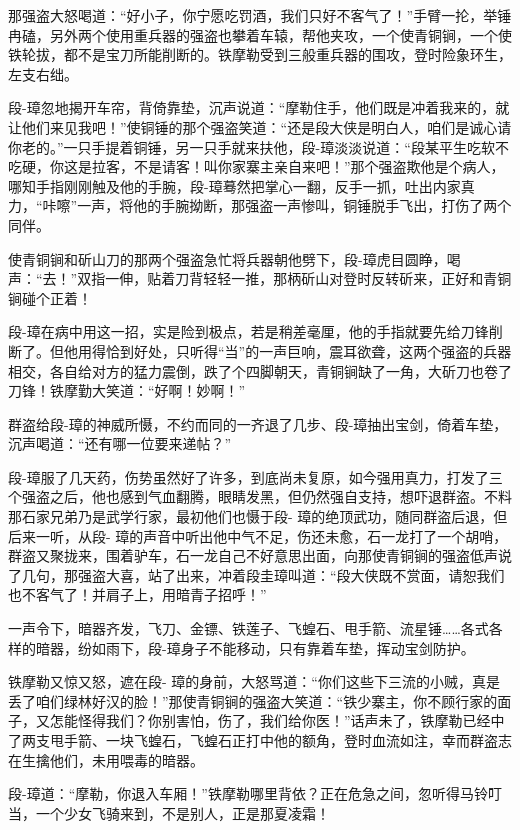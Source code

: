 \documentclass[12pt,oneside]{book}
\begin{document}
那强盗大怒喝道：``好小子，你宁愿吃罚酒，我们只好不客气了！''手臂一抡，举锤冉磕，另外两个使用重兵器的强盗也攀着车辕，帮他夹攻，一个使青铜锏，一个使铁轮拔，都不是宝刀所能削断的。铁摩勒受到三般重兵器的围攻，登时险象环生，左支右绌。

段-璋忽地揭开车帘，背倚靠垫，沉声说道：``摩勒住手，他们既是冲着我来的，就让他们来见我吧！''使铜锤的那个强盗笑道：``还是段大侠是明白人，咱们是诚心请你老的。''一只手提着铜锤，另一只手就来扶他，段-璋淡淡说道：``段某平生吃软不吃硬，你这是拉客，不是请客！叫你家寨主亲自来吧！''那个强盗欺他是个病人，哪知手指刚刚触及他的手腕，段-璋蓦然把掌心一翻，反手一抓，吐出内家真力，``咔嚓''一声，将他的手腕拗断，那强盗一声惨叫，铜锤脱手飞出，打伤了两个同伴。

使青铜锏和斫山刀的那两个强盗急忙将兵器朝他劈下，段-璋虎目圆睁，喝声：``去！''双指一伸，贴着刀背轻轻一推，那柄斫山对登时反转斫来，正好和青铜锏碰个正着！

段-璋在病中用这一招，实是险到极点，若是稍差毫厘，他的手指就要先给刀锋削断了。但他用得恰到好处，只听得``当''的一声巨响，震耳欲聋，这两个强盗的兵器相交，各自给对方的猛力震倒，跌了个四脚朝天，青铜锏缺了一角，大斫刀也卷了刀锋！铁摩勤大笑道：``好啊！妙啊！''

群盗给段-璋的神威所慑，不约而同的一齐退了几步、段-璋抽出宝剑，倚着车垫，沉声喝道：``还有哪一位要来递帖？''

段-璋服了几天药，伤势虽然好了许多，到底尚未复原，如今强用真力，打发了三个强盗之后，他也感到气血翻腾，眼睛发黑，但仍然强自支持，想吓退群盗。不料那石家兄弟乃是武学行家，最初他们也慑于段-
璋的绝顶武功，随同群盗后退，但后来一听，从段-
璋的声音中听出他中气不足，伤还未愈，石一龙打了一个胡哨，群盗又聚拢来，围着驴车，石一龙自己不好意思出面，向那使青铜锏的强盗低声说了几句，那强盗大喜，站了出来，冲着段圭璋叫道：``段大侠既不赏面，请恕我们也不客气了！并肩子上，用暗青子招呼！''

一声令下，暗器齐发，飞刀、金镖、铁莲子、飞蝗石、甩手箭、流星锤\ldots\ldots 各式各样的暗器，纷如雨下，段-璋身子不能移动，只有靠着车垫，挥动宝剑防护。

铁摩勒又惊又怒，遮在段-
璋的身前，大怒骂道：``你们这些下三流的小贼，真是丢了咱们绿林好汉的脸！''那使青铜锏的强盗大笑道：``铁少寨主，你不顾行家的面子，又怎能怪得我们？你别害怕，伤了，我们给你医！''话声未了，铁摩勒已经中了两支甩手箭、一块飞蝗石，飞蝗石正打中他的额角，登时血流如注，幸而群盗志在生擒他们，未用喂毒的暗器。

段-璋道：``摩勒，你退入车厢！''铁摩勒哪里背依？正在危急之间，忽听得马铃叮当，一个少女飞骑来到，不是别人，正是那夏凌霜！
\end{document}
